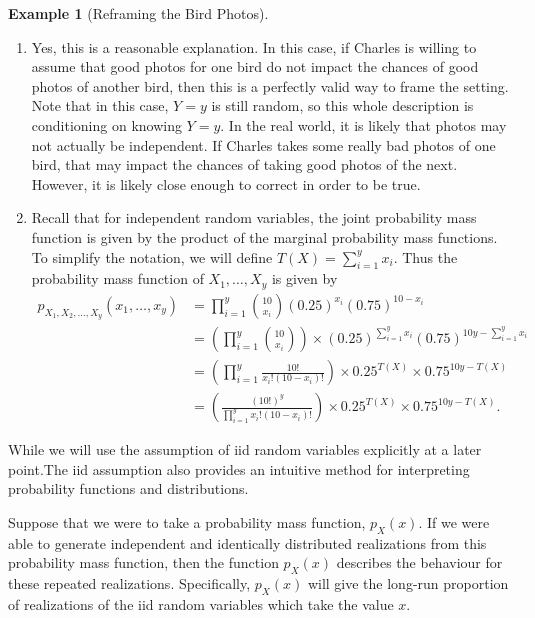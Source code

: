 \documentclass[
  letterpaper,
  DIV=11,
  numbers=noendperiod]{scrreprt}
\theoremstyle{definition}
\theoremstyle{definition}
\theoremstyle{definition}
\newtheorem{example}{Example}[chapter]
\theoremstyle{remark}
\begin{document}
\begin{example}[Reframing the Bird
Photos]
\begin{tcolorbox}[enhanced jigsaw, colback=white, breakable, rightrule=.15mm, leftrule=.75mm, toprule=.15mm, left=2mm, arc=.35mm, opacityback=0, bottomrule=.15mm]
\begin{enumerate}
\def\labelenumi{\alph{enumi}.}
\item
  Yes, this is a reasonable explanation. In this case, if Charles is
  willing to assume that good photos for one bird do not impact the
  chances of good photos of another bird, then this is a perfectly valid
  way to frame the setting. Note that in this case, \(Y=y\) is still
  random, so this whole description is conditioning on knowing \(Y=y\).
  In the real world, it is likely that photos may not actually be
  independent. If Charles takes some really bad photos of one bird, that
  may impact the chances of taking good photos of the next. However, it
  is likely close enough to correct in order to be true.
\item
  Recall that for independent random variables, the joint probability
  mass function is given by the product of the marginal probability mass
  functions. To simplify the notation, we will define
  \(T(X) = \sum_{i=1}^y x_i\). Thus the probability mass function of
  \(X_1,\dots,X_y\) is given by \begin{align*}
   p_{X_1,X_2,\dots,X_y}(x_1,\dots,x_y) &= \prod_{i=1}^y \binom{10}{x_i}(0.25)^{x_i}(0.75)^{10-x_i} \\
   &= \left(\prod_{i=1}^y\binom{10}{x_i}\right)\times(0.25)^{\sum_{i=1}^y x_i}(0.75)^{10y - \sum_{i=1}^yx_i} \\
   &= \left(\prod_{i=1}^y \frac{10!}{x_i!(10-x_i)!}\right)\times 0.25^{T(X)}\times 0.75^{10y - T(X)} \\
   &= \left(\frac{(10!)^y}{\prod_{i=1}^y x_i!(10 - x_i)!}\right)\times 0.25^{T(X)}\times 0.75^{10y - T(X)}.
  \end{align*}
\end{enumerate}

\end{tcolorbox}

\end{example}

While we will use the assumption of iid random variables explicitly at a
later point.The iid assumption also provides an intuitive method for
interpreting probability functions and distributions.

Suppose that we were to take a probability mass function, \(p_X(x)\). If
we were able to generate independent and identically distributed
realizations from this probability mass function, then the function
\(p_X(x)\) describes the behaviour for these repeated realizations.
Specifically, \(p_X(x)\) will give the long-run proportion of
realizations of the iid random variables which take the value \(x\).
\end{document}
